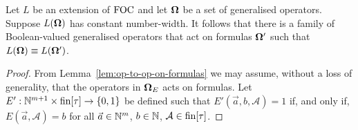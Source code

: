 \documentclass[../main/thesis.tex]{subfiles}
\begin{document}
\begin{lem}
  Let $L$ be an extension of $\text{\upshape FOC}$ and let $\mathbf{\mathbf{\Omega}}$ be a set of generalised
  operators. Suppose $L(\mathbf{\mathbf{\Omega}})$ has constant number-width. It follows that
  there is a family of Boolean-valued generalised operators that act on formulas
  $\mathbf{\mathbf{\Omega}}'$ such that $L(\mathbf{\mathbf{\Omega}}) \equiv L(\mathbf{\mathbf{\Omega}}')$.
\end{lem}

\begin{proof}
  From Lemma~\ref{lem:op-to-op-on-formulas} we may assume, without a loss of
  generality, that the operators in $\mathbf{\mathbf{\Omega}}_E$ acts on formulas. Let $E' :
  \mathbb{N}^{m + 1} \times \text{\upshape fin}[\tau] \rightarrow \{0,1\}$ be defined such that $E'(\vec{a},
  b, \mathcal{A}) = 1$ if, and only if, $E(\vec{a}, \mathcal{A}) = b$ for all
  $\vec{a} \in \mathbb{N}^m$, $b \in \mathbb{N}$, $\mathcal{A} \in \text{\upshape fin}[\tau]$.


\end{proof}
\end{document}
